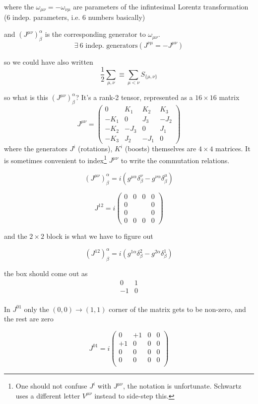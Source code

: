 \documentclass[11pt]{article}
\begin{document}
where the $\omega_{\mu\nu} = - \omega_{\nu\mu}$ are parameters of the infintesimal Lorentz transformation (6 indep. parameters, i.e. 6 numbers basically)

and $(J^{\mu\nu})^\alpha_\beta$ is the corresponding generator to $\omega_{\mu\nu}$. \[ \exists\ \text{6  indep. generators} (J^{\nu\mu} = - J^{\mu\nu})\]


so we could have also written \[ \frac{1}{2} \sum_{\mu,\nu} \equiv \sum_{\mu < \nu} S_{\{\mu, \nu\}}\]	


so what is this $(J^{\mu\nu})^\alpha_\beta$? It's a rank-2 tensor, represented as a $16\times 16$ matrix \[J^{\mu\nu} = \begin{pmatrix}
	0 & K_1 & K_2 & K_3\\
	-K_1 & 0 & J_3 & -J_2\\
	-K_2 & -J_3 & 0 & J_1\\
	-K_3 & J_2 & -J_1 & 0
\end{pmatrix}\]
where the generators $J^i$ (rotations), $K^i$ (boosts) themselves are $4\times 4$ matrices. It is sometimes convenient to index\footnote{One should not confuse $J^i$ with $J^{\mu\nu}$, the notation is unfortunate. Schwartz uses a different letter $V^{\mu\nu}$ instead to side-step this.} $J^{\mu\nu}$ to write the commutation relations.

\[ (J^{\mu\nu})^\alpha_\beta = i(g^{\mu\alpha} \delta ^\nu_\beta - g^{\nu\alpha} \delta^\mu_\beta) \]

\[ J^{12} = i \begin{pmatrix}
	0 & 0 & 0 & 0\\
	0 & & &0\\
	0 & & & 0\\
	0 & 0 & 0 & 0
\end{pmatrix}\]

and the $2\times2$ block is what we have to figure out

\[ (J^{12})^\alpha_\beta =
 i(g^{1\alpha} \delta^{2}_{\beta} - g^{2\alpha} \delta^1_\beta )\]
 
 
 the box should come out as \[\begin{matrix}
 	0 & 1 \\
 	-1 & 0\\
 \end{matrix}\]
 
 
 In $ J^{01}$ only the $(0, 0) \rightarrow (1, 1)$ corner of the matrix gets to be non-zero, and the rest are zero
 
 \[ J^{01} = i \begin{pmatrix}
 	0 & +1 & 0 & 0\\
 	+1 & 0 & 0 & 0\\
 	0 & 0 & 0& 0\\
 	0 & 0 & 0& 0\\
 \end{pmatrix}\]
 
\end{document}
